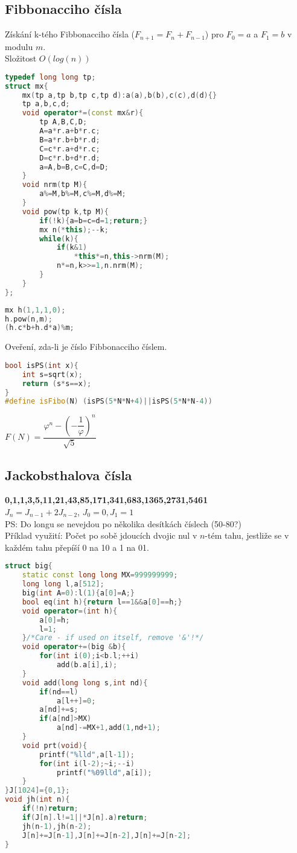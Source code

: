 \documentclass[11pt]{article}
\begin{document}
\subsection{Fibbonacciho čísla}
Získání k-tého Fibbonacciho čísla ($F_{n+1}=F_n+F_{n-1}$) pro $F_0=a$ a $F_1=b$ v modulu $m$.
\\Složitost $O(log(n))$
\begin{lstlisting}[language=C++]
typedef long long tp;
struct mx{
    mx(tp a,tp b,tp c,tp d):a(a),b(b),c(c),d(d){}
    tp a,b,c,d;
    void operator*=(const mx&r){
        tp A,B,C,D;
        A=a*r.a+b*r.c;
        B=a*r.b+b*r.d;
        C=c*r.a+d*r.c;
        D=c*r.b+d*r.d;
        a=A,b=B,c=C,d=D;
    }
    void nrm(tp M){
        a%=M,b%=M,c%=M,d%=M;
    }
    void pow(tp k,tp M){
        if(!k){a=b=c=d=1;return;}
        mx n(*this);--k;
        while(k){
            if(k&1)
                *this*=n,this->nrm(M);
            n*=n,k>>=1,n.nrm(M);
        }
    }
};
\end{lstlisting}
\begin{lstlisting}[language=C++]
mx h(1,1,1,0);
h.pow(n,m);
(h.c*b+h.d*a)%m;
\end{lstlisting}
\begin{center}
Oveření, zda-li je číslo Fibbonacciho číslem.
\end{center}
\begin{lstlisting}[language=C++]
bool isPS(int x){
    int s=sqrt(x);
    return (s*s==x);
}
#define isFibo(N) (isPS(5*N*N+4)||isPS(5*N*N-4))
\end{lstlisting}
$F(N)=\dfrac{\varphi^n-(-\dfrac{1}{\varphi})^n}{\sqrt{5}}$
\subsection{Jackobsthalova čísla}
\textbf{0,1,1,3,5,11,21,43,85,171,341,683,1365,2731,5461}
\\$J_n=J_{n-1}+2J_{n-2}$, $J_0=0,J_1=1$
\\PS: Do longu se nevejdou po několika desítkách číslech (50-80?)
\\Příklad využití: Počet po sobě jdoucích dvojic nul v $n$-tém tahu, jestliže se v každém tahu přepíší 0 na 10 a 1 na 01.
\begin{lstlisting}[language=C++]
struct big{
    static const long long MX=999999999;
    long long l,a[512];
    big(int A=0):l(1){a[0]=A;}
    bool eq(int h){return l==1&&a[0]==h;}
    void operator=(int h){
        a[0]=h;
        l=1;
    }/*Care - if used on itself, remove '&'!*/
    void operator+=(big &b){
        for(int i(0);i<b.l;++i)
            add(b.a[i],i);
    }
    void add(long long s,int nd){
        if(nd==l)
            a[l++]=0;
        a[nd]+=s;
        if(a[nd]>MX)
            a[nd]-=MX+1,add(1,nd+1);
    }
    void prt(void){
        printf("%lld",a[l-1]);
        for(int i(l-2);~i;--i)
            printf("%09lld",a[i]);
    }
}J[1024]={0,1};
void jh(int n){
    if(!n)return;
    if(J[n].l!=1||*J[n].a)return;
    jh(n-1),jh(n-2);
    J[n]+=J[n-1],J[n]+=J[n-2],J[n]+=J[n-2];
}
\end{lstlisting}
\end{document}
